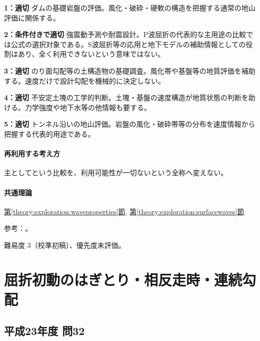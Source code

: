 \noindent\textbf{1：適切} ダムの基礎岩盤の評価。風化・破砕・硬軟の構造を把握する通常の地山評価に関係する。\par

\noindent\textbf{2：条件付きで適切} 強震動予測や耐震設計。P波屈折の代表的な主用途の比較では公式の選択対象である。S波屈折等の応用と地下モデルの補助情報としての役割はあり、全く利用できないという意味ではない。\par

\noindent\textbf{3：適切} のり面勾配等の土構造物の基礎調査。風化帯や基盤等の地質評価を補助する。速度だけで設計勾配を機械的に決定しない。\par

\noindent\textbf{4：適切} 不安定土塊の工学的判断。土塊・基盤の速度構造が地質状態の判断を助ける。力学強度や地下水等の他情報も要する。\par

\noindent\textbf{5：適切} トンネル沿いの地山評価。岩盤の風化・破砕帯等の分布を速度情報から把握する代表的用途である。\par

\paragraph{再利用する考え方} 主としてという比較を、利用可能性が一切ないという全称へ変えない。

\paragraph{共通理論} \hyperref[theory:exploration:waveproperties]{第\ref*{theory:exploration:waveproperties}節}, \hyperref[theory:exploration:surfacewaves]{第\ref*{theory:exploration:surfacewaves}節}

\par 参考：\cite{segj_integrated2017,jica_refraction2015,japansea_spac2017}。

\par 難易度 3（校準初稿）、優先度未評価。

\section{屈折初動のはぎとり・相反走時・連続勾配}

\subsection{平成23年度 問32}
\label{q:h23-reg-applied-32}

